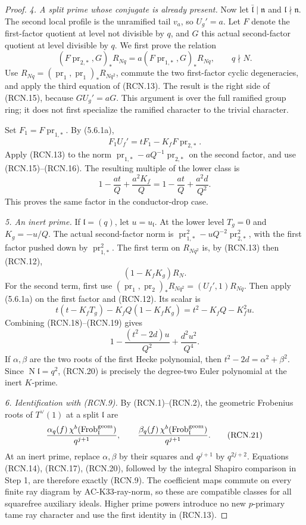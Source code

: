 \begin{proof}
\emph{4. A split prime whose conjugate is already present.}
Now let \(\bar{\mathfrak l}\mid\mathfrak n\) and
\(\mathfrak l\nmid\mathfrak n\).
The second local profile is the unramified tail \(v_a\),
so \(U_g'=a\).
Let \(F\) denote the first-factor quotient at level not
divisible by \(q\), and \(G\) this actual second-factor
quotient at level divisible by \(q\).
We first prove the relation
\[
 (F\operatorname{pr}_{2,*},G)_*R_{Nq}
       =a(F\operatorname{pr}_{1,*},G)_*R_{Nq},
 \qquad q\nmid N.
 \tag{RCN.15}
\]
Use \(R_{Nq}=(\operatorname{pr}_1,\operatorname{pr}_1)_*
R_{Nq^2}\), commute the two first-factor cyclic
degeneracies, and apply the third equation of
(RCN.13).  The result is the right side of (RCN.15),
because \(G U_g'=aG\).
This argument is over the full ramified group ring;
it does not first specialize the ramified character
to the trivial character.

Set \(F_1=F\operatorname{pr}_{1,*}\).
By (5.6.1a),
\[
 F_1U_f'=tF_1-K_fF\operatorname{pr}_{2,*}.
 \tag{RCN.16}
\]
Apply (RCN.13) to the norm
\(\operatorname{pr}_{1,*}-aQ^{-1}\operatorname{pr}_{2,*}\)
on the second factor, and use (RCN.15)--(RCN.16).
The resulting multiple of the lower class is
\[
 1-\frac{at}{Q}+\frac{a^2K_f}{Q}
       =1-\frac{at}{Q}+\frac{a^2d}{Q^2}.
 \tag{RCN.17}
\]
This proves the same factor in the conductor-drop case.

\emph{5. An inert prime.}
If \(\mathfrak l=(q)\), let \(u=u_{\mathfrak l}\).
At the lower level \(T_g=0\) and \(K_g=-u/Q\).
The actual second-factor norm is
\(\operatorname{pr}_{1,*}^2-uQ^{-2}
\operatorname{pr}_{2,*}^2\), with the first factor
pushed down by \(\operatorname{pr}_{1,*}^2\).
The first term on \(R_{Nq^2}\) is, by (RCN.13) then
(RCN.12),
\[
                   (1-K_fK_g)R_N.
 \tag{RCN.18}
\]
For the second term, first use
\((\operatorname{pr}_1,\operatorname{pr}_2)_*R_{Nq^2}
=(U_f',1)R_{Nq}\).
Then apply (5.6.1a) on the first factor and (RCN.12).
Its scalar is
\[
 t(t-K_fT_g)-K_f Q(1-K_fK_g)
       =t^2-K_fQ-K_f^2u .
 \tag{RCN.19}
\]
Combining (RCN.18)--(RCN.19) gives
\[
 1-\frac{(t^2-2d)u}{Q^2}
       +\frac{d^2u^2}{Q^4}.
 \tag{RCN.20}
\]
If \(\alpha,\beta\) are the two roots of the first
Hecke polynomial, then
\(t^2-2d=\alpha^2+\beta^2\).
Since \(\operatorname N\mathfrak l=q^2\), (RCN.20)
is precisely the degree-two Euler polynomial at
the inert \(K\)-prime.

\emph{6. Identification with (RCN.9).}
By (RCN.1)--(RCN.2), the geometric Frobenius roots of
\(T^\vee(1)\) at a split \(\mathfrak l\) are
\[
 \frac{\alpha_q(f)\,
       \chi^b(\operatorname{Frob}_{\mathfrak l}^{\rm geom})}
      {q^{j+1}},
 \qquad
 \frac{\beta_q(f)\,
       \chi^b(\operatorname{Frob}_{\mathfrak l}^{\rm geom})}
      {q^{j+1}}.
 \tag{RCN.21}
\]
At an inert prime, replace \(\alpha,\beta\) by their
squares and \(q^{j+1}\) by \(q^{2j+2}\).
Equations (RCN.14), (RCN.17), (RCN.20), followed by
the integral Shapiro comparison in Step 1, are therefore
exactly (RCN.9).
The coefficient maps commute on every finite ray
diagram by AC-K33-ray-norm, so these are compatible
classes for all squarefree auxiliary ideals.
Higher prime powers introduce no new \(p\)-primary
tame ray character and use the first identity in
(RCN.13).


\end{proof}
